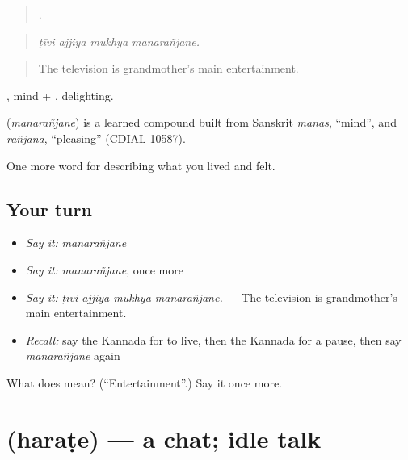 \begin{quote}
   .
\end{quote}

\begin{quote}
\emph{ṭīvi ajjiya mukhya manarañjane.}
\end{quote}

\begin{quote}
The television is grandmother's main entertainment.
\end{quote}

, mind + , delighting.

\begin{cousinweb}
\textbf{} (\emph{manarañjane}) is a learned compound built from Sanskrit \emph{manas}, \textquotedblleft{}mind\textquotedblright{}, and \emph{rañjana}, \textquotedblleft{}pleasing\textquotedblright{} (CDIAL 10587).
\end{cousinweb}

\begin{grammarlens}[title={What you've built}]
One more word for describing what you lived and felt.
\end{grammarlens}

\subsection*{Your turn}
\begin{itemize}
\raggedright
  \item \emph{Say it:} \emph{manarañjane}
  \item \emph{Say it:} \emph{manarañjane}, once more
  \item \emph{Say it:} \emph{ṭīvi ajjiya mukhya manarañjane.} — The television is grandmother's main entertainment.
  \item \emph{Recall:} say the Kannada for to live, then the Kannada for a pause, then say \emph{manarañjane} again
\end{itemize}

\begin{tcolorbox}[breakable,colback=teal!4,colframe=teal!35!black,title={Before you move on}]
What does  mean? (\textquotedblleft{}Entertainment\textquotedblright{}.) Say it once more.
\end{tcolorbox}
\section[\texorpdfstring{\kn{ಹರಟೆ} (haraṭe)}{ಹರಟೆ (haraṭe)}]{ (haraṭe) — a chat; idle talk}

